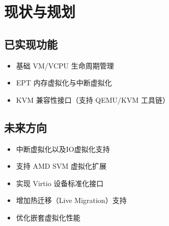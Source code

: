 \documentclass{mancls}
\begin{document}
\section{现状与规划}
\subsection{已实现功能}
\begin{itemize}
    \item 基础 VM/VCPU 生命周期管理
    \item EPT 内存虚拟化与中断虚拟化
    \item KVM 兼容性接口（支持 QEMU/KVM 工具链）
\end{itemize}

\subsection{未来方向}
\begin{itemize}
    \item 中断虚拟化以及IO虚拟化支持
    \item 支持 AMD SVM 虚拟化扩展
    \item 实现 Virtio 设备标准化接口
    \item 增加热迁移（Live Migration）支持
    \item 优化嵌套虚拟化性能
\end{itemize}
\end{document}
